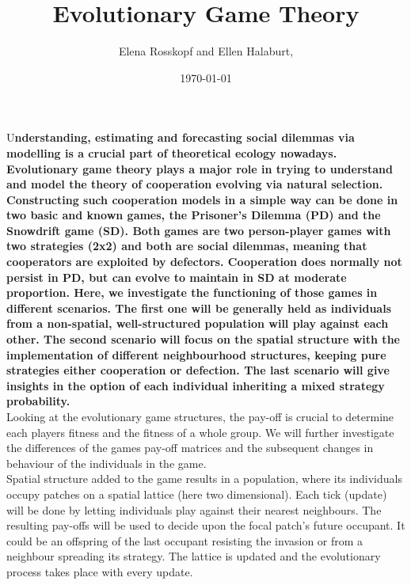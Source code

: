 \documentclass[DIV=calc, paper=a4, fontsize=11pt, twocolumn]{scrartcl}	 %
\title{Evolutionary Game Theory} %
\author{Elena Rosskopf and Ellen Halaburt, } %
\date{\today} %
\newcommand{\initial}[1]{ %
\lettrine[lines=3,lhang=0.3,nindent=0em]{
\color{DarkGoldenrod}
{\textsf{#1}}}{}}
\begin{document}
\maketitle %

\thispagestyle{fancy} %


\initial{U}\textbf{nderstanding, estimating and forecasting social dilemmas via modelling is a crucial part of theoretical ecology nowadays. Evolutionary game theory plays a major role in trying to understand and model the theory of cooperation evolving via natural selection. Constructing such cooperation models in a simple way can be done in two basic and known games, the Prisoner's Dilemma (PD) and the Snowdrift game (SD). Both games are two person-player games with two strategies (2x2) and both are social dilemmas, meaning that cooperators are exploited by defectors. Cooperation does normally not persist in PD, but can evolve to maintain in SD at moderate proportion. Here, we investigate the functioning of those games in different scenarios. The first one will be generally held as individuals from a non-spatial, well-structured population will play against each other. The second scenario will focus on the spatial structure with the implementation of different neighbourhood structures, keeping pure strategies either cooperation or defection. The last scenario will give insights in the option of each individual inheriting a mixed strategy probability. }\\

Looking at the evolutionary game structures, the pay-off is crucial to determine each players fitness and the fitness of a whole group. We will further investigate the differences of the games pay-off matrices and the subsequent changes in behaviour of the individuals in the game. \\

Spatial structure added to the game results in a population, where its individuals occupy patches on a spatial lattice (here two dimensional). 
Each tick (update) will be done by letting individuals play against their nearest neighbours. The resulting pay-offs will be used to decide upon the focal patch's future occupant. It could be an offspring of the last occupant resisting the invasion or from a neighbour spreading its strategy. The lattice is updated and the evolutionary process takes place with every update.
\end{document}

